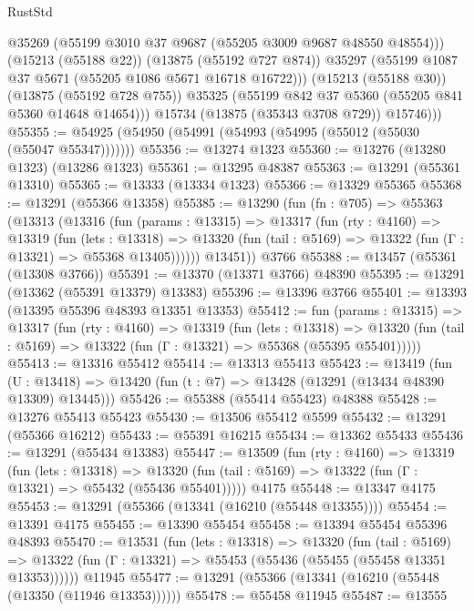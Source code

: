 \begin{lexlean}{RustStd}
\begin{coremodule}
                @35269
                (@55199 @3010 @37 @9687 (@55205 @3009 @9687 @48550 @48554)))
              (@15213 (@55188 @22))
              (@13875 (@55192 @727 @874))
              @35297
              (@55199 @1087 @37 @5671 (@55205 @1086 @5671 @16718 @16722)))
            (@15213 (@55188 @30))
            (@13875 (@55192 @728 @755))
            @35325
            (@55199 @842 @37 @5360 (@55205 @841 @5360 @14648 @14654)))
          @15734
          (@13875 (@35343 @3708 @729))
          @15746)))
@55355 := @54925 (@54950 (@54991 (@54993 (@54995 (@55012 (@55030 (@55047 @55347)))))))
@55356 := @13274 @1323
@55360 := @13276 (@13280 @1323) (@13286 @1323)
@55361 := @13295 @48387
@55363 := @13291 (@55361 @13310)
@55365 := @13333 (@13334 @1323)
@55366 := @13329 @55365
@55368 := @13291 (@55366 @13358)
@55385 := @13290
    (fun (fn : @705) =>
    @55363
      (@13313
        (@13316
          (fun (params : @13315) =>
          @13317
            (fun (rty : @4160) =>
            @13319
              (fun (lets : @13318) =>
              @13320 (fun (tail : @5169) => @13322 (fun (Γ : @13321) => @55368 @13405))))))
        @13451))
    @3766
@55388 := @13457 (@55361 (@13308 @3766))
@55391 := @13370 (@13371 @3766) @48390
@55395 := @13291 (@13362 (@55391 @13379) @13383)
@55396 := @13396 @3766
@55401 := @13393 (@13395 @55396 @48393 @13351 @13353)
@55412 := fun (params : @13315) =>
  @13317
    (fun (rty : @4160) =>
    @13319
      (fun (lets : @13318) =>
      @13320 (fun (tail : @5169) => @13322 (fun (Γ : @13321) => @55368 (@55395 @55401)))))
@55413 := @13316 @55412
@55414 := @13313 @55413
@55423 := @13419
    (fun (U : @13418) => @13420 (fun (t : @7) => @13428 (@13291 (@13434 @48390 @13309) @13445)))
@55426 := @55388 (@55414 @55423) @48388
@55428 := @13276 @55413 @55423
@55430 := @13506 @55412 @5599
@55432 := @13291 (@55366 @16212)
@55433 := @55391 @16215
@55434 := @13362 @55433
@55436 := @13291 (@55434 @13383)
@55447 := @13509
    (fun (rty : @4160) =>
    @13319
      (fun (lets : @13318) =>
      @13320 (fun (tail : @5169) => @13322 (fun (Γ : @13321) => @55432 (@55436 @55401)))))
    @4175
@55448 := @13347 @4175
@55453 := @13291 (@55366 (@13341 (@16210 (@55448 @13355))))
@55454 := @13391 @4175
@55455 := @13390 @55454
@55458 := @13394 @55454 @55396 @48393
@55470 := @13531
    (fun (lets : @13318) =>
    @13320
      (fun (tail : @5169) =>
      @13322 (fun (Γ : @13321) => @55453 (@55436 (@55455 (@55458 @13351 @13353))))))
    @11945
@55477 := @13291 (@55366 (@13341 (@16210 (@55448 (@13350 (@11946 @13353))))))
@55478 := @55458 @11945
@55487 := @13555

\end{coremodule}
\end{lexlean}
